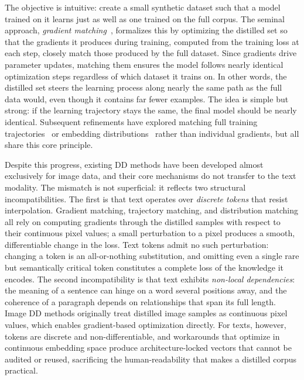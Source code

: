 \begin{foldable}
  The objective is intuitive: create a small synthetic dataset such that a model trained on it learns just as well as one trained on the full corpus.
  The seminal approach, \textit{gradient matching}~\cite{wang2018dataset}, formalizes this by optimizing the distilled set so that the gradients it produces during training, computed from the training loss at each step, closely match those produced by the full dataset.
  Since gradients drive parameter updates, matching them ensures the model follows nearly identical optimization steps regardless of which dataset it trains on.
  In other words, the distilled set steers the learning process along nearly the same path as the full data would, even though it contains far fewer examples.
  The idea is simple but strong: if the learning trajectory stays the same, the final model should be nearly identical.
  Subsequent refinements have explored matching full training trajectories~\cite{cazenavette2022dataset} or embedding distributions~\cite{zhao2023dataset} rather than individual gradients, but all share this core principle.
\end{foldable}

\begin{foldable}
  Despite this progress, existing \ac{DD} methods have been developed almost exclusively for image data, and their core mechanisms do not transfer to the text modality.
  The mismatch is not superficial: it reflects two structural incompatibilities.
  The first is that text operates over \textit{discrete tokens} that resist interpolation.
  Gradient matching, trajectory matching, and distribution matching all rely on computing gradients through the distilled samples with respect to their continuous pixel values; a small perturbation to a pixel produces a smooth, differentiable change in the loss.
  Text tokens admit no such perturbation: changing a token is an all-or-nothing substitution, and omitting even a single rare but semantically critical token constitutes a complete loss of the knowledge it encodes.
  The second incompatibility is that text exhibits \textit{non-local dependencies}: the meaning of a sentence can hinge on a word several positions away, and the coherence of a paragraph depends on relationships that span its full length.
  Image \ac{DD} methods originally treat distilled image samples as continuous pixel values, which enables gradient-based optimization directly.
  For texts, however, tokens are discrete and non-differentiable, and workarounds that optimize in continuous embedding space produce architecture-locked vectors that cannot be audited or reused, sacrificing the human-readability that makes a distilled corpus practical.
\end{foldable}

